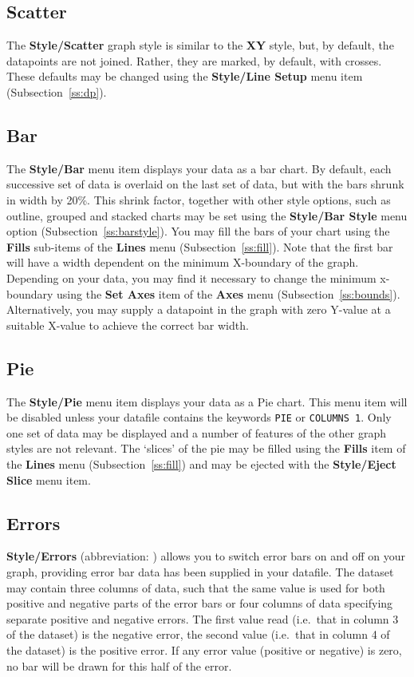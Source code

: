\subsection{Scatter}
The {\bf Style/Scatter}  graph style is similar to the {\bf XY} style, 
but, by default, the datapoints are not joined. Rather, they are marked, by default, 
with crosses. 
These defaults may be changed using the {\bf Style/Line Setup} menu item 
(Subsection~\ref{ss:dp}).


\subsection{Bar}
The {\bf Style/Bar}  menu item displays your data as 
a bar chart. By default, each 
successive set of data is overlaid on the last set of data, but with the bars 
shrunk in width by 20\%. This shrink factor, together with other style options, 
such as outline, grouped and stacked charts may be set using the {\bf Style/Bar 
Style} menu option (Subsection~\ref{ss:barstyle}). You may fill the bars of 
your chart 
using the {\bf Fills} sub-items of the {\bf Lines} menu (Subsection~\ref{ss:fill}).
Note that the first bar will have a width dependent on the minimum X-boundary of 
the graph. Depending on your data, you may find it necessary to change the minimum 
x-boundary using the 
{\bf Set Axes} item of the {\bf Axes} menu (Subsection~\ref{ss:bounds}).
Alternatively, you may supply a datapoint in the graph with zero Y-value at a 
suitable X-value to achieve the correct bar width.

\subsection{Pie}
The {\bf Style/Pie}  menu item displays your data as 
a Pie chart. This menu item will be disabled unless your datafile contains the 
keywords {\tt PIE} or {\tt COLUMNS 1}. Only one set of data may 
be displayed and a number of features of the other graph styles are not relevant. 
The `slices' of the pie may be filled using the {\bf Fills} item of the
{\bf Lines} menu (Subsection~\ref{ss:fill}) and may be ejected with the {\bf 
Style/Eject Slice} menu item. 


\subsection{Errors}
{\bf Style/Errors} (abbreviation: ) allows  you to switch error 
bars on and off on your graph, providing 
error bar data has been supplied in your datafile.
The dataset may contain three columns of data, such that the same value is
used for both positive and negative parts of the
error bars or four columns of data specifying separate positive and
negative errors. The first value read (i.e.\ that in column 3 of the dataset)
is the negative error, the second value (i.e.\ that in column 4 of the dataset)
is the positive error. If any error value (positive or negative) is zero, no bar
will be drawn for this half of the error.

